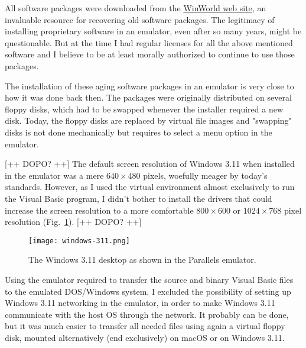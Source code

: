 All software packages were downloaded from the \href{https://winworldpc.com}{WinWorld web site}, an invaluable resource for recovering old software packages. 
The legitimacy of installing proprietary software in an emulator, even after so many years, might be questionable. But at the time I had regular licenses for all the above mentioned software and I believe to be at least morally authorized to continue to use those packages.

The installation of these aging software packages in an emulator is very close to how it was done back then.
The packages were originally distributed on several floppy disks, which had to be swapped whenever the installer required a new disk. Today, the floppy disks are replaced by virtual file images and "swapping" disks is not done mechanically but requires to select a menu option in the emulator.

[++ DOPO? ++] The default screen resolution of Windows 3.11 when installed in the emulator was a mere $640  \times 480$ pixels,  woefully meager by today's standards.
However, as I used the virtual environment almost exclusively to run the Visual Basic program, I didn't bother to install the drivers that could increase the screen resolution to a more comfortable $800 \times 600$ or $1024 \times 768$ pixel resolution (Fig.~\ref{fig:windows-311}). [++ DOPO? ++]


\begin{figure}[tbh]
	\centering
	\texttt{[image: windows-311.png]}
	\caption{The Windows 3.11 desktop as shown in the Parallels emulator.}
	\label{fig:windows-311}
\end{figure}



Using the emulator required to transfer the source and binary Visual Basic files to the emulated DOS/Windows system.
I excluded the possibility of setting up Windows 3.11 networking in the emulator, in order to make Windows 3.11 communicate with the host OS through the network.
It probably can be done, but it was much easier to transfer all needed files using again a virtual floppy disk, mounted alternatively (end exclusively) on macOS or on Windows 3.11.

